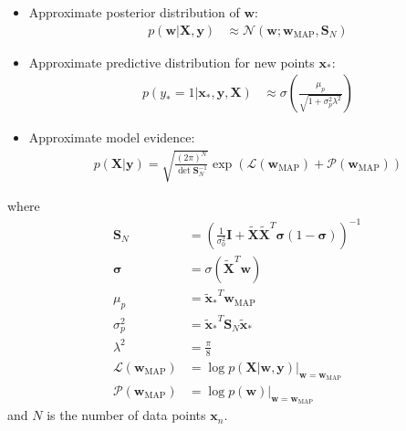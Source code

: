 \documentclass[a4paper]{article}
\begin{document}
    \begin{itemize}
        \item Approximate posterior distribution of $\bm{w}$:
        \begin{align}
            p(\bm{w} | \bm{X}, \bm{y}) &\approx \mathcal{N}(\bm{w}; \bm{w}_\text{MAP}, \bm{S}_N)
        \end{align}
        \noindent
        \item Approximate predictive distribution for new points $\bm{x}_*$:
        \begin{align}
            p(y_* = 1 | \bm{x}_*, \bm{y}, \bm{X}) &\approx \sigma\left(\frac{\mu_p}{\sqrt{1 + \sigma_p^2\lambda^2}}\right)
        \end{align}
        \item Approximate model evidence:
        \begin{align}
            p(\bm{X} | \bm{y}) = \sqrt{\frac{(2\pi)^N}{\det \bm{S}_N^{-1}}}
                                 \exp \left(\mathcal{L}(\bm{w}_\text{MAP}) + \mathcal{P}(\bm{w}_\text{MAP})\right)
        \end{align}
    \end{itemize}
    where
    \begin{align}
        \bm{S}_N &= \left(\frac{1}{\sigma_0^2}\bm{I} + \tilde{\bm{X}}\tilde{\bm{X}}^T \bm{\sigma} (1 - \bm{\sigma})\right)^{-1} \\
        \bm{\sigma} &= \sigma(\tilde{\bm{X}}^T \bm{w}) \\
        \mu_p &= {\tilde{\bm{x}}_*}^T \bm{w}_\text{MAP} \\
        \sigma_p^2 &= {\tilde{\bm{x}}_*}^T \bm{S}_N \tilde{\bm{x}}_* \\
        \lambda^2 &= \frac{\pi}{8} \\
        \mathcal{L}(\bm{w}_\text{MAP}) &= \log p(\bm{X} | \bm{w}, \bm{y}) \big|_{\bm{w} = \bm{w}_\text{MAP}} \\
        \mathcal{P}(\bm{w}_\text{MAP}) &= \log p(\bm{w}) \big|_{\bm{w} = \bm{w}_\text{MAP}}
    \end{align}
    and $N$ is the number of data points $\bm{x}_n$.
\end{document}
